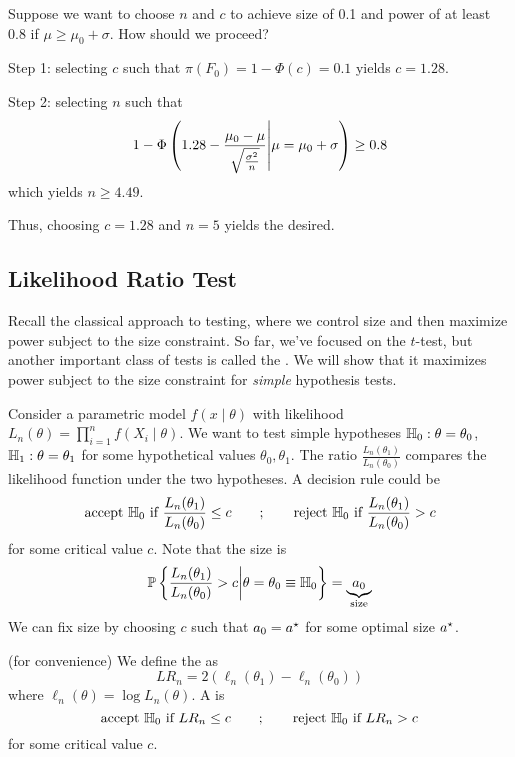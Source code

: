 \documentclass[10pt]{article}
\begin{document}
\begin{example}
	Suppose we want to choose $n$ and $c$ to achieve size of 0.1 and power of at least 0.8 if $\mu \ge \mu_0 + \sigma$. How should we proceed?
	
	Step 1: selecting $c$ such that $\pi(F_0) = 1 - \Phi(c) = 0.1$ yields $c = 1.28$.
	
	Step 2: selecting $n$ such that
	\[
	1 - \Phi\left( 1.28 - \frac{\mu_0 - \mu}{\sqrt{\frac{\sigma^2}{n}}} \middle| \mu = \mu_0 + \sigma\right) \ge 0.8
	\]
	which yields $n \ge 4.49$.
	
	Thus, choosing $c = 1.28$ and $n = 5$ yields the desired.
\end{example}

\subsection{Likelihood Ratio Test}

Recall the classical approach to testing, where we control size and then maximize power subject to the size constraint. So far, we've focused on the $t$-test, but another important class of tests is called the . We will show that it maximizes power subject to the size constraint for \emph{simple} hypothesis tests.

Consider a parametric model $f(x \mid \theta)$ with likelihood $L_n(\theta) = \prod_{i=1}^n f(X_i\mid\theta)$. We want to test simple hypotheses $\mathbb{H}_0 : \theta = \theta_0$, $\mathbb{H}_1 : \theta = \theta_1$ for some hypothetical values $\theta_0,\theta_1$. The ratio $\frac{L_n(\theta_1)}{L_n(\theta_0)}$ compares the likelihood function under the two hypotheses. A decision rule could be
\[
\text{accept }\mathbb{H}_0\text{ if }\frac{L_n(\theta_1)}{L_n(\theta_0)}\le c \qquad ; \qquad \text{reject }\mathbb{H}_0\text{ if }\frac{L_n(\theta_1)}{L_n(\theta_0)}> c
\]
for some critical value $c$. Note that the size is
\[
\mathbb{P}\left\{ \frac{L_n(\theta_1)}{L_n(\theta_0)} > c \middle| \theta = \theta_0 \equiv \mathbb{H}_0\right\} = \underbrace{a_0}_{\text{size}}
\]
We can fix size by choosing $c$ such that $a_0 = a^\star$ for some optimal size $a^\star$. 

\begin{definition}
	(for convenience) We define the  as 
	\[
	LR_n = 2 ( \ell_n(\theta_1) - \ell_n(\theta_0))
	\]
	where $\ell_n(\theta) = \log L_n(\theta)$. A  is
	\[
	\text{accept }\mathbb{H}_0\text{ if }LR_n \le c \qquad ; \qquad \text{reject }\mathbb{H}_0\text{ if }LR_n> c
	\]
	for some critical value $c$. 
\end{definition}
\end{document}
